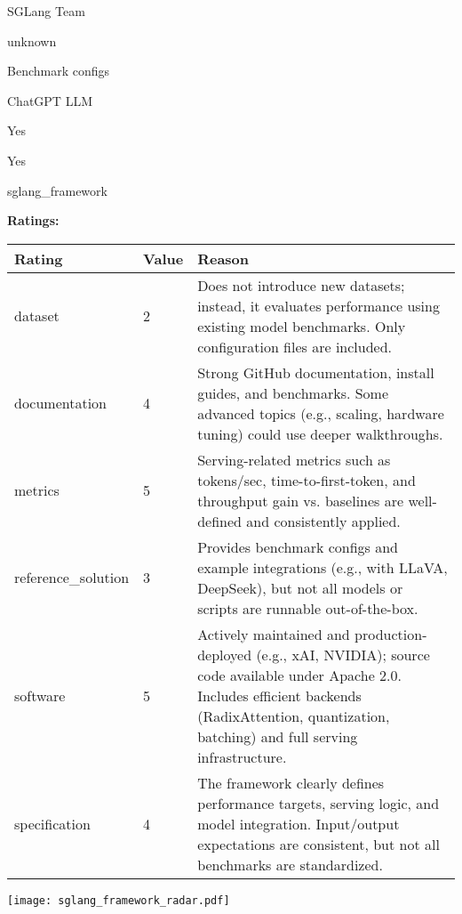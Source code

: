 {{\begin{description}[labelwidth=4cm, labelsep=1em, leftmargin=4cm, itemsep=0.1em, parsep=0em]
  \item[contact.name:] SGLang Team
  \item[contact.email:] unknown
  \item[datasets.links.name:] Benchmark configs
  \item[results.links.name:] ChatGPT LLM
  \item[fair.reproducible:] Yes
  \item[fair.benchmark\_ready:] Yes
  \item[id:] sglang\_framework
  \item[Citations:] \cite{zheng2024sglangefficientexecutionstructured}
\end{description}

{\bf Ratings:} ~ \\

\begin{tabular}{p{} p{} p{}}
\hline
Rating & Value & Reason \\
\hline
dataset & 2 & Does not introduce new datasets; instead, it evaluates performance using existing model benchmarks.
Only configuration files are included.
 \\
documentation & 4 & Strong GitHub documentation, install guides, and benchmarks. Some advanced topics (e.g.,
scaling, hardware tuning) could use deeper walkthroughs.
 \\
metrics & 5 & Serving-related metrics such as tokens/sec, time-to-first-token, and throughput gain vs. baselines
are well-defined and consistently applied.
 \\
reference\_solution & 3 & Provides benchmark configs and example integrations (e.g., with LLaVA, DeepSeek), but not all
models or scripts are runnable out-of-the-box.
 \\
software & 5 & Actively maintained and production-deployed (e.g., xAI, NVIDIA); source code available under
Apache 2.0. Includes efficient backends (RadixAttention, quantization, batching) and full
serving infrastructure.
 \\
specification & 4 & The framework clearly defines performance targets, serving logic, and model integration.
Input/output expectations are consistent, but not all benchmarks are standardized.
 \\
\hline
\end{tabular}

\texttt{[image: sglang\_framework\_radar.pdf]}
}}
\clearpage